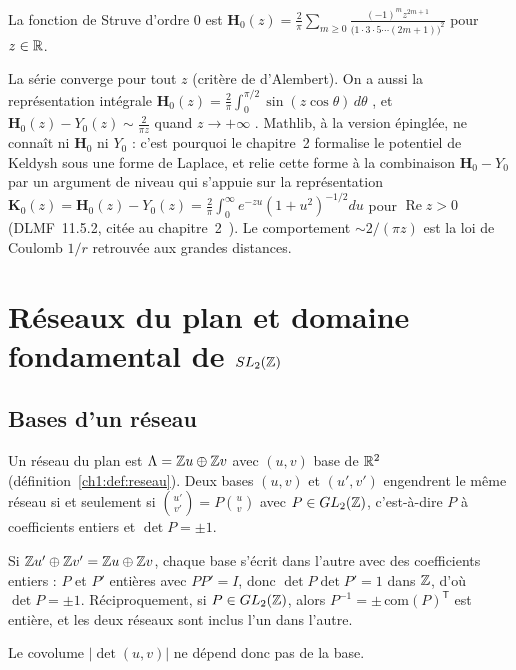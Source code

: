 \begin{definition}
La fonction de Struve d'ordre $0$ est $\mathbf H_0(z)=\frac2\pi\sum_{m\ge0}\frac{(-1)^mz^{2m+1}}{\bigl(1\cdot3\cdot5\cdots(2m+1)\bigr)^2}$
pour $z\in\mathbb{R}$.
\end{definition}
La série converge pour tout $z$ (critère de d'Alembert). On a aussi la représentation intégrale
$\mathbf H_0(z)=\frac2\pi\int_0^{\pi/2}\sin(z\cos\theta)\,d\theta$ \tierL, et $\mathbf H_0(z)-Y_0(z)\sim\frac2{\pi z}$
quand $z\to+\infty$ \tierL. Mathlib, à la version épinglée, ne connaît ni $\mathbf H_0$ ni $Y_0$ : c'est pourquoi le
chapitre~2 formalise le potentiel de Keldysh sous une forme de Laplace, et relie cette forme à la combinaison
$\mathbf H_0-Y_0$ par un argument de niveau \tierC{} qui s'appuie sur la représentation
$\mathbf K_0(z)=\mathbf H_0(z)-Y_0(z)=\frac2\pi\int_0^\infty e^{-zu}(1+u^2)^{-1/2}du$ pour $\operatorname{Re}z>0$
(DLMF~11.5.2, citée au chapitre~2~\cite{ch2dlmf}). Le comportement $\sim 2/(\pi z)$ est la loi de Coulomb $1/r$
retrouvée aux grandes distances.

\section{Réseaux du plan et domaine fondamental de \texorpdfstring{$SL_2(\mathbb{Z})$}{SL2(Z)}}\label{appA:sec:sl2}

\subsection{Bases d'un réseau}
Un réseau du plan est $\Lambda=\mathbb{Z} u\oplus\mathbb{Z} v$ avec $(u,v)$ base de $\mathbb{R}^2$ (définition~\ref{ch1:def:reseau}). Deux bases
$(u,v)$ et $(u',v')$ engendrent le même réseau si et seulement si $\binom{u'}{v'}=P\binom uv$ avec $P\in GL_2(\mathbb{Z})$,
c'est-à-dire $P$ à coefficients entiers et $\det P=\pm1$.

\begin{humanproof}
Si $\mathbb{Z} u'\oplus\mathbb{Z} v'=\mathbb{Z} u\oplus\mathbb{Z} v$, chaque base s'écrit dans l'autre avec des coefficients entiers : $P$ et $P'$
entières avec $PP'=I$, donc $\det P\det P'=1$ dans $\mathbb{Z}$, d'où $\det P=\pm1$. Réciproquement, si $P\in GL_2(\mathbb{Z})$, alors
$P^{-1}=\pm\,\mathrm{com}(P)^{\mathsf T}$ est entière, et les deux réseaux sont inclus l'un dans l'autre.
\end{humanproof}
Le covolume $|\det(u,v)|$ ne dépend donc pas de la base.

